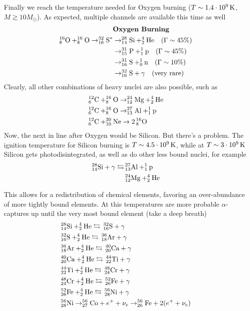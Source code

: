 Finally we reach the temperature needed for Oxygen burning ($T\sim 1.4\power{10}{9}\unit{K}$, $M\gtrsim 10M_{\odot}$). As expected, multiple channels are available this time as well
\begin{align*}
    & \text{\textbf{Oxygen Burning}}\\
    \element{O}{16}{8}+\element{O}{16}{8}\to\element{S}{32}{16}^{*}&\to\element{Si}{28}{14}+\element{He}{4}{2}\quad (\Gamma \sim 45\%)\\
    & \to \element{P}{31}{15}+\element{p}{1}{1}\quad (\Gamma \sim 45\%)\\
    & \to \element{S}{31}{16}+\element{n}{1}{0}\quad (\Gamma \sim 10\%)\\
    & \to \element{S}{32}{16}+\gamma\quad (\text{very rare})
\end{align*}
Clearly, all other combinations of heavy nuclei are also possible, such as 
\begin{align*}
    & \element{C}{12}{6}+\element{O}{16}{8}\to\element{Mg}{24}{12}+\element{He}{4}{2}\\
    & \element{C}{12}{6}+\element{O}{16}{8}\to\element{Al}{27}{13}+\element{p}{1}{1}\\
    & \element{C}{12}{6}+\element{Ne}{20}{10}\to 2\,\element{O}{16}{8}
\end{align*}
Now, the next in line after Oxygen would be Silicon. But there's a problem. The ignition temperature for Silicon burning is $T\sim 4.5\power{10}{9}\unit{K}$, while at $T\sim 3\power{10}{9}\unit{K}$ Silicon gets photodisintegrated, as well as do other less bound nuclei, for example
\begin{align*}
    \element{Si}{28}{14} +\gamma \leftrightarrows\,& \element{Al}{27}{13}+\element{p}{1}{1}\\
    & \element{Mg}{24}{12}+\element{He}{4}{2}
\end{align*}
\par This allows for a redistribution of chemical elements, favoring an over-abundance of more tightly bound elements. At this temperatures are more probable $\alpha$-captures up until the very most bound element (take a deep breath)
\begin{align*}
    & \element{Si}{28}{14}+\element{He}{4}{2}\leftrightarrows \,\element{S}{32}{16}+\gamma\\
    & \element{S}{32}{16}+\element{He}{4}{2}\leftrightarrows \,\element{Ar}{36}{18}+\gamma\\
    & \element{Ar}{36}{18}+\element{He}{4}{2}\leftrightarrows \,\element{Ca}{40}{20}+\gamma\\
    & \element{Ca}{40}{20}+\element{He}{4}{2}\leftrightarrows \,\element{Ti}{44}{22}+\gamma\\
    & \element{Ti}{44}{22}+\element{He}{4}{2}\leftrightarrows \,\element{Cr}{48}{24}+\gamma\\
    & \element{Cr}{48}{24}+\element{He}{4}{2}\leftrightarrows \,\element{Fe}{52}{26}+\gamma\\
    & \element{Fe}{52}{26}+\element{He}{4}{2}\leftrightarrows \,\element{Ni}{56}{28}+\gamma\\
    & \element{Ni}{56}{28}\to \element{Co}{56}{27}+e^{+}+\nu_{e}\to \element{Fe}{56}{26}+2(e^{+}+\nu_{e})
\end{align*}
